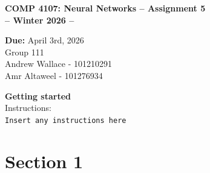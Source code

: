 \documentclass[12pt]{article}
\begin{document}
 

\begin{center} \Large\bf
COMP 4107: Neural Networks -- Assignment 5\\
-- Winter 2026 -- 
\end{center} 

\begin{center}
{\bf Due:} April 3rd, 2026 \\
Group 111 \\
Andrew Wallace - 101210291\\
Amr Altaweel - 101276934\\[1em]
\end{center}
\textbf{Getting started} \\
Instructions: \\
  \texttt{Insert any instructions here} \\
\vspace{0.5em}
\newpage 

\section*{Section 1}
\end{document}

